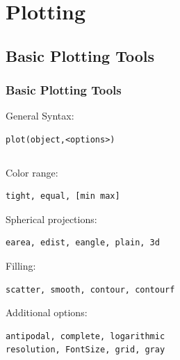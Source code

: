 
\section{Plotting}


\subsection*{Basic Plotting Tools}

\begin{frame}[fragile]
  \frametitle{Basic \MTEX Plotting Tools}

General Syntax:
\begin{lstlisting}
plot(object,<options>)
\end{lstlisting}

\begin{columns}
  \begin{column}{8.5cm}





    Color range:

\begin{lstlisting}
tight, equal, [min max]
\end{lstlisting}

    Spherical projections:
\begin{lstlisting}
earea, edist, eangle, plain, 3d
\end{lstlisting}

    Filling:
\begin{lstlisting}
scatter, smooth, contour, contourf
\end{lstlisting}

    Additional options:
\begin{lstlisting}
antipodal, complete, logarithmic
resolution, FontSize, grid, gray
\end{lstlisting}


  \end{column}


\end{columns}
\end{frame}
